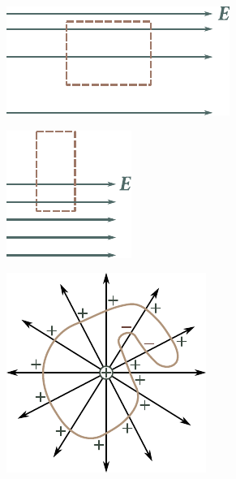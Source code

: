 \begin{figure}[t]
	\begin{minipage}[t]{0.36\linewidth}
		\begin{center}
			\includegraphics[scale=0.93]{figures/ch_01/fig_1_34.pdf}
			\caption[]{}
			\label{fig:1_34}
		\end{center}
	\end{minipage}
	\hfill{ }
	\begin{minipage}[t]{0.2\linewidth}
		\begin{center}
			\includegraphics[scale=0.93]{figures/ch_01/fig_1_35.pdf}
			\caption[]{}
			\label{fig:1_35}
		\end{center}
	\end{minipage}
	\hfill{ }
	\begin{minipage}[t]{0.37\linewidth}
		\begin{center}
			\includegraphics[scale=0.95]{figures/ch_01/fig_1_36.pdf}
			\caption[]{}
			\label{fig:1_36}
		\end{center}
	\end{minipage}
\vspace{-0.45cm}
\end{figure}

